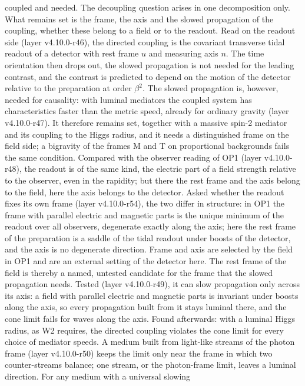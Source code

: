coupled and needed.  The decoupling question arises in one decomposition
only.  What remains set is the frame, the axis and the slowed propagation
of the coupling, whether these belong to a field or to the readout.
Read on the readout side (layer v4.10.0-r46), the directed coupling is the
covariant transverse tidal readout of a detector with rest frame \(u\) and
measuring axis \(n\).  The time orientation then drops out, the slowed
propagation is not needed for the leading contrast, and the contrast is
predicted to depend on the motion of the detector relative to the
preparation at order \(\beta^2\).  The slowed propagation is, however,
needed for causality: with luminal mediators the coupled system has
characteristics faster than the metric speed, already for ordinary
gravity (layer v4.10.0-r47).  It therefore remains set, together with a
massive spin-2 mediator and its coupling to the Higgs radius, and it
needs a distinguished frame on the field side; a bigravity of the frames
M and T on proportional backgrounds fails the same condition.  Compared
with the observer reading of OP1 (layer v4.10.0-r48), the readout is of the
same kind, the electric part of a field strength relative to the
observer, even in the rapidity; but there the rest frame and the axis
belong to the field, here the axis belongs to the detector.  Asked
whether the readout fixes its own frame (layer v4.10.0-r54), the two
differ in structure: in OP1 the frame with parallel electric and
magnetic parts is the unique minimum of the readout over all observers,
degenerate exactly along the axis; here the rest frame of the
preparation is a saddle of the tidal readout under boosts of the
detector, and the axis is no degenerate direction.  Frame and axis are
selected by the field in OP1 and are an external setting of the
detector here.  The rest
frame of the field is thereby a named, untested candidate for the frame
that the slowed propagation needs.  Tested (layer v4.10.0-r49), it can
slow propagation only across its axis: a field with parallel electric
and magnetic parts is invariant under boosts along the axis, so every
propagation built from it stays luminal there, and the cone limit fails
for waves along the axis.  Found afterwards: with a luminal Higgs radius,
as W2 requires, the directed coupling violates the cone limit for every
choice of mediator speeds.  A medium built from light-like streams of the
photon frame (layer v4.10.0-r50) keeps the limit only near the frame in
which two counter-streams balance; one stream, or the photon-frame limit,
leaves a luminal direction.  For any medium with a universal slowing
